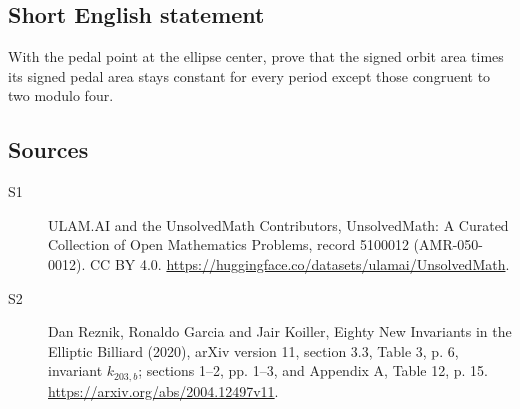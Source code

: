\documentclass[11pt]{article}
\begin{document}
\subsection{Short English statement}
With the pedal point at the ellipse center, prove that the signed orbit area times its signed pedal area stays constant for every period except those congruent to two modulo four.
\subsection{Sources}
\begin{description}
\item[\hypertarget{source:5100012:1}{S1}] ULAM.AI and the UnsolvedMath Contributors, UnsolvedMath: A Curated Collection of Open Mathematics Problems, record 5100012 (AMR-050-0012). CC BY 4.0. \url{https://huggingface.co/datasets/ulamai/UnsolvedMath}.
\item[\hypertarget{source:5100012:2}{S2}] Dan Reznik, Ronaldo Garcia and Jair Koiller, Eighty New Invariants in the Elliptic Billiard (2020), arXiv version 11, section 3.3, Table 3, p. 6, invariant $k_{203,b}$; sections 1--2, pp. 1--3, and Appendix A, Table 12, p. 15. \url{https://arxiv.org/abs/2004.12497v11}.
\end{description}
\label{end:5100012}
\end{document}
